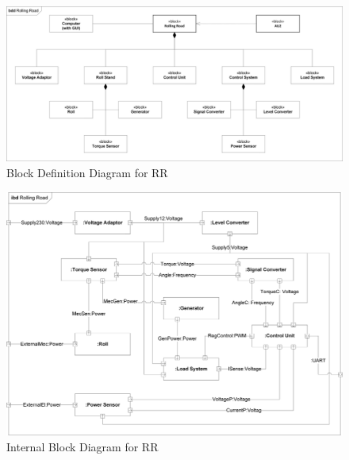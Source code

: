 \begin{figure}[H]
	\centering
	\includegraphics[width=1\linewidth]{Architecture/BDD_RR}
	\caption{Block Definition Diagram for RR}
	\label{fig:BDD_RR}
\end{figure}

\begin{figure}[H]
	\centering
	\includegraphics[width=1\linewidth]{Architecture/IBD_RR}
	\caption{Internal Block Diagram for RR}
	\label{fig:IBD_RR}
\end{figure}